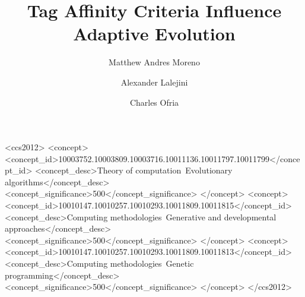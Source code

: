 \documentclass[dvipsnames,format=sigconf,anonymous=true]{acmart}
\begin{document}
\title{Tag Affinity Criteria Influence Adaptive Evolution}

\author{Matthew Andres Moreno}

\author{Alexander Lalejini}

\author{Charles Ofria}

\renewcommand{\shortauthors}{Moreno et al.}





\begin{CCSXML}
<ccs2012>
   <concept>
       <concept_id>10003752.10003809.10003716.10011136.10011797.10011799</concept_id>
       <concept_desc>Theory of computation~Evolutionary algorithms</concept_desc>
       <concept_significance>500</concept_significance>
       </concept>
   <concept>
       <concept_id>10010147.10010257.10010293.10011809.10011815</concept_id>
       <concept_desc>Computing methodologies~Generative and developmental approaches</concept_desc>
       <concept_significance>500</concept_significance>
       </concept>
   <concept>
       <concept_id>10010147.10010257.10010293.10011809.10011813</concept_id>
       <concept_desc>Computing methodologies~Genetic programming</concept_desc>
       <concept_significance>500</concept_significance>
       </concept>
 </ccs2012>
\end{CCSXML}
\end{document}
